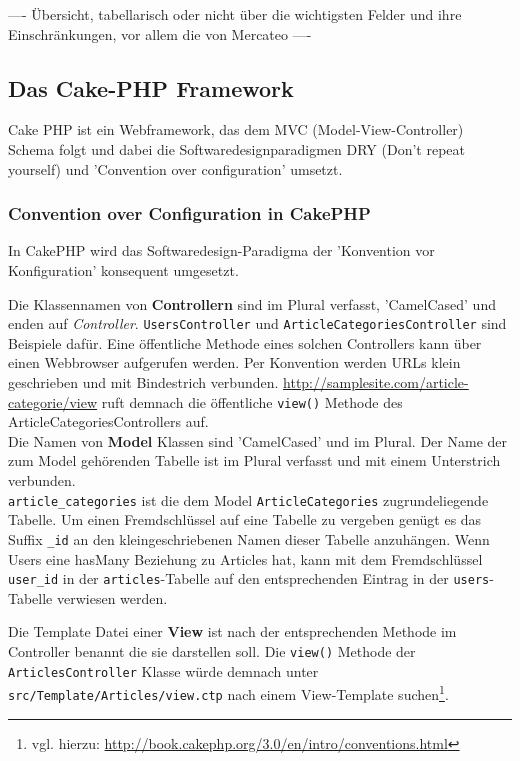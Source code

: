 	
	---- Übersicht, tabellarisch oder nicht über die wichtigsten Felder und ihre Einschränkungen, vor allem die von Mercateo ----
	
	\subsection{Das Cake-PHP Framework}
	
	Cake PHP ist ein Webframework, das dem MVC (Model-View-Controller) Schema folgt und dabei die Softwaredesignparadigmen DRY (Don't repeat yourself) und 'Convention over configuration' umsetzt. 
	
	\subsubsection{Convention over Configuration in CakePHP}
	
	In CakePHP wird das Softwaredesign-Paradigma der 'Konvention vor Konfiguration' konsequent umgesetzt.\newline 
	
	 Die Klassennamen von \textbf{Controllern} sind im Plural verfasst, 'CamelCased' und enden auf \textit{Controller}. \texttt{UsersController} und \texttt{ArticleCategoriesController} sind Beispiele dafür. Eine öffentliche Methode eines solchen Controllers kann über einen Webbrowser aufgerufen werden. Per Konvention werden URLs klein geschrieben und mit Bindestrich verbunden.
	\url{http://samplesite.com/article-categorie/view} ruft demnach die öffentliche \texttt{view()} Methode des ArticleCategoriesControllers auf.\\
	\newline
	Die Namen von \textbf{Model} Klassen sind 'CamelCased' und im Plural. Der Name der zum Model gehörenden Tabelle ist im Plural verfasst und mit einem Unterstrich verbunden.\\
	\texttt{article\_categories} ist die dem Model \texttt{ArticleCategories} zugrundeliegende Tabelle. Um einen Fremdschlüssel auf eine Tabelle zu vergeben genügt es das Suffix \texttt{\_id} an den kleingeschriebenen Namen dieser Tabelle anzuhängen. Wenn Users eine hasMany Beziehung zu Articles hat, kann mit dem Fremdschlüssel \texttt{user\_id} in der \texttt{articles}-Tabelle auf den entsprechenden Eintrag in der \texttt{users}-Tabelle verwiesen werden. \newline
	
	Die Template Datei einer \textbf{View} ist nach der entsprechenden Methode im Controller benannt die sie darstellen soll. Die \texttt{view()} Methode der \texttt{ArticlesController} Klasse würde demnach unter \texttt{src/Template/Articles/view.ctp} nach einem View-Template suchen\footnote{vgl. hierzu: \url{http://book.cakephp.org/3.0/en/intro/conventions.html}}.
	
